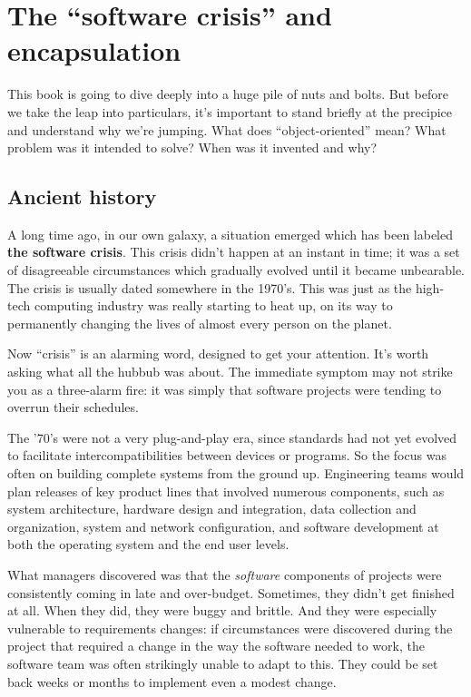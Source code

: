 
\chapter{The ``software crisis'' and encapsulation}
\label{ch:encapsulation}

This book is going to dive deeply into a huge pile of nuts and bolts. But
before we take the leap into particulars, it's important to stand briefly at
the precipice and understand why we're jumping. What does ``object-oriented''
mean? What problem was it intended to solve? When was it invented and why?

\section{Ancient history}

A long time ago, in our own galaxy, a situation emerged which has been labeled
\textbf{the software crisis}. This crisis didn't happen at an instant in time;
it was a set of disagreeable circumstances which gradually evolved until it
became unbearable. The crisis is usually dated somewhere in the 1970's. This
was just as the high-tech computing industry was really starting to heat up,
on its way to permanently changing the lives of almost every person on the planet.

Now ``crisis'' is an alarming word, designed to get your attention. It's worth
asking what all the hubbub was about. The immediate symptom may not strike you
as a three-alarm fire: it was simply that software projects were tending to
overrun their schedules.

The '70's were not a very plug-and-play era, since standards had not yet
evolved to facilitate intercompatibilities between devices or programs. So the
focus was often on building complete systems from the ground up. Engineering
teams would plan releases of key product lines that involved numerous
components, such as system architecture, hardware design and integration, data
collection and organization, system and network configuration, and software
development at both the operating system and the end user levels.

What managers discovered was that the \textit{software} components of projects
were consistently coming in late and over-budget. Sometimes, they didn't get
finished at all. When they did, they were buggy and brittle. And they were
especially vulnerable to requirements changes: if circumstances were
discovered during the project that required a change in the way the software
needed to work, the software team was often strikingly unable to adapt to
this. They could be set back weeks or months to implement even a modest
change.

